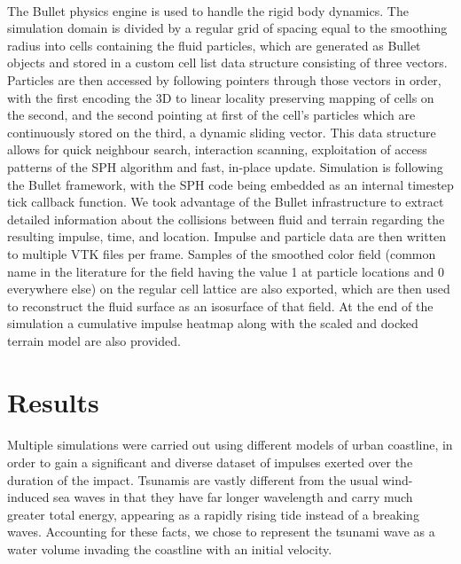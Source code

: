 \documentclass{llncs}
\begin{document}
\paragraph{} The Bullet physics engine is used to handle the rigid body dynamics. The
simulation domain is divided by a regular grid of spacing equal to the smoothing radius
into cells containing the fluid particles, which are generated as Bullet objects and
stored in a custom cell list data structure consisting of three vectors. Particles are
then accessed by following pointers through those vectors in order, with the first
encoding the 3D to linear locality preserving mapping of cells on the second, and the
second pointing at first of the cell's particles which are continuously stored on the
third, a dynamic sliding vector. This data structure allows for quick neighbour search,
interaction scanning, exploitation of access patterns of the SPH algorithm and fast,
in-place update. Simulation is following the Bullet framework, with the SPH code being
embedded as an internal timestep tick callback function. We took advantage of the Bullet
infrastructure to extract detailed information about the collisions between fluid and
terrain regarding the resulting impulse, time, and location. Impulse and particle data are
then written to multiple VTK files per frame. Samples of the smoothed color field (common
name in the literature for the field having the value 1 at particle locations and 0
everywhere else) on the regular cell lattice are also exported, which are then used to
reconstruct the fluid surface as an isosurface of that field. At the end of the simulation
a cumulative impulse heatmap along with the scaled and docked terrain model are also
provided.

\section{Results}
\paragraph{} Multiple simulations were carried out using different models of urban
coastline, in order to gain a significant and diverse dataset of impulses exerted over the
duration of the impact. Tsunamis are vastly different from the usual wind-induced sea
waves in that they have far longer wavelength and carry much greater total energy,
appearing as a rapidly rising tide instead of a breaking waves. Accounting for these
facts, we chose to represent the tsunami wave as a water volume invading the coastline
with an initial velocity.
\end{document}
